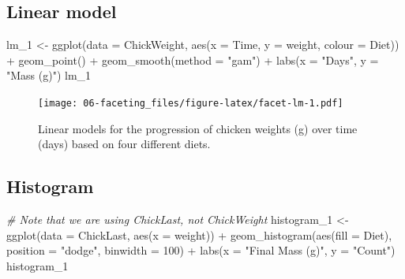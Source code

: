 \documentclass[
]{book}
\newenvironment{Shaded}{\begin{snugshade}}{\end{snugshade}}
\newcommand{\AttributeTok}[1]{\textcolor[rgb]{0.77,0.63,0.00}{#1}}
\newcommand{\CommentTok}[1]{\textcolor[rgb]{0.56,0.35,0.01}{\textit{#1}}}
\newcommand{\DecValTok}[1]{\textcolor[rgb]{0.00,0.00,0.81}{#1}}
\newcommand{\FunctionTok}[1]{\textcolor[rgb]{0.00,0.00,0.00}{#1}}
\newcommand{\NormalTok}[1]{#1}
\newcommand{\OtherTok}[1]{\textcolor[rgb]{0.56,0.35,0.01}{#1}}
\newcommand{\SpecialCharTok}[1]{\textcolor[rgb]{0.00,0.00,0.00}{#1}}
\newcommand{\StringTok}[1]{\textcolor[rgb]{0.31,0.60,0.02}{#1}}
\begin{document}
\hypertarget{linear-model}{%
\subsection{Linear model}\label{linear-model}}

\begin{Shaded}
\begin{Highlighting}[]
\NormalTok{lm\_1 }\OtherTok{\textless{}{-}} \FunctionTok{ggplot}\NormalTok{(}\AttributeTok{data =}\NormalTok{ ChickWeight, }\FunctionTok{aes}\NormalTok{(}\AttributeTok{x =}\NormalTok{ Time, }\AttributeTok{y =}\NormalTok{ weight, }\AttributeTok{colour =}\NormalTok{ Diet)) }\SpecialCharTok{+}
  \FunctionTok{geom\_point}\NormalTok{() }\SpecialCharTok{+}
  \FunctionTok{geom\_smooth}\NormalTok{(}\AttributeTok{method =} \StringTok{"gam"}\NormalTok{) }\SpecialCharTok{+}
  \FunctionTok{labs}\NormalTok{(}\AttributeTok{x =} \StringTok{"Days"}\NormalTok{, }\AttributeTok{y =} \StringTok{"Mass (g)"}\NormalTok{)}
\NormalTok{lm\_1}
\end{Highlighting}
\end{Shaded}

\begin{figure}
\centering
\texttt{[image: 06-faceting\_files/figure-latex/facet-lm-1.pdf]}
\caption{\label{fig:facet-lm}Linear models for the progression of chicken weights (g) over time (days) based on four different diets.}
\end{figure}

\hypertarget{histogram}{%
\subsection{Histogram}\label{histogram}}

\begin{Shaded}
\begin{Highlighting}[]
\CommentTok{\# Note that we are using \textquotesingle{}ChickLast\textquotesingle{}, not \textquotesingle{}ChickWeight\textquotesingle{}}
\NormalTok{histogram\_1 }\OtherTok{\textless{}{-}} \FunctionTok{ggplot}\NormalTok{(}\AttributeTok{data =}\NormalTok{ ChickLast, }\FunctionTok{aes}\NormalTok{(}\AttributeTok{x =}\NormalTok{ weight)) }\SpecialCharTok{+}
  \FunctionTok{geom\_histogram}\NormalTok{(}\FunctionTok{aes}\NormalTok{(}\AttributeTok{fill =}\NormalTok{ Diet), }\AttributeTok{position =} \StringTok{"dodge"}\NormalTok{, }\AttributeTok{binwidth =} \DecValTok{100}\NormalTok{) }\SpecialCharTok{+}
  \FunctionTok{labs}\NormalTok{(}\AttributeTok{x =} \StringTok{"Final Mass (g)"}\NormalTok{, }\AttributeTok{y =} \StringTok{"Count"}\NormalTok{)}
\NormalTok{histogram\_1}
\end{Highlighting}
\end{Shaded}
\end{document}
